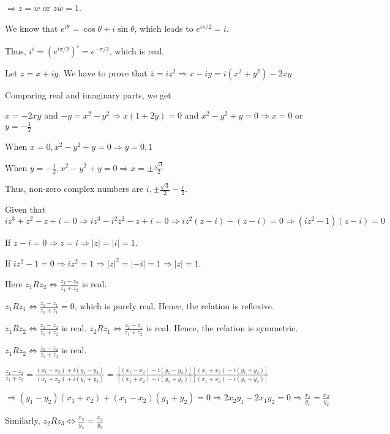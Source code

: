   $\Rightarrow z = w$ or $z\overline{w} = 1$.
\item We know that $e^{i\theta} = \cos\theta + i\sin\theta$, which leads to $e^{i\pi/2} = i$.

  Thus, $i^i = \left(e^{i\pi/2}\right)^i = e^{-\pi/2}$, which is real.
\item Let $z = x + iy$. We have to prove that $\overline{z} = iz^2 \Rightarrow x - iy = i(x^2 + y^2) -2xy$

  Comparing real and imaginary parts, we get

  $x = -2xy$ and $-y = x^2 - y^2\Rightarrow x(1 + 2y) = 0$ and $x^2 - y^2 + y = 0\Rightarrow x = 0$ or $y =
  -\frac{1}{2}$

  When $x = 0, x^2 - y^2 + y = 0 \Rightarrow y = 0, 1$

  When $y = -\frac{1}{2}, x^2 - y^2 + y = 0 \Rightarrow x = \pm\frac{\sqrt{3}}{2}$

  Thus, non-zero complex numbers are $i, \pm\frac{\sqrt{3}}{2} - \frac{i}{2}$.
\item Given that $iz^3 + z^2 - z + i = 0 \Rightarrow iz^3 - i^2z^2 - z + i = 0\Rightarrow iz^2(z - i) - (z -
  i) = 0 \Rightarrow (iz^2 - 1)(z - i) = 0$

  If $z - i = 0 \Rightarrow z = i \Rightarrow |z| = |i| = 1$.

  If $iz^2 - 1 = 0 \Rightarrow iz^2 = 1\Rightarrow |z|^2 = |-i| = 1\Rightarrow |z| = 1$.
\item Here $z_1Rz_2\Leftrightarrow \frac{z_1 - z_2}{z_1 + z_2}$ is real.

  $z_1Rz_1\Leftrightarrow \frac{z_1 - z_1}{z_1 + z_1} = 0$, which is purely real. Hence, the relation is
  reflexive.

  $z_1Rz_2\Leftrightarrow \frac{z_1 - z_2}{z_1 + z_2}$ is real. $z_2Rz_1\Leftrightarrow \frac{z_2 - z_1}{z_1
    + z_2}$ is real. Hence, the relation is symmetric.

  $z_1Rz_2\Leftrightarrow \frac{z_1 - z_2}{z_1 + z_2}$ is real.

  $\frac{z_1 - z_2}{z_1 + z_2} = \frac{(x_1 - x_2) + i(y_1 - y_2)}{(x_1 + x_2) + i(y_1 + y_2)} = \frac{[(x_1
      - x_2) + i(y_1 - y_2)][(x_1 + x_2) - i(y_1 + y_2)]}{[(x_1 + x_2) + i(y_1 + y_2)][(x_1 + x_2) - i(y_1 +
      y_2)]}$

  $\Rightarrow (y_1 - y_2)(x_1 + x_2) + (x_1 - x_2)(y_1 + y_2) = 0 \Rightarrow 2x_2y_1 - 2x_1y_2 = 0
  \Rightarrow \frac{x_1}{y_1} = \frac{x_2}{y_2}$

  Similarly, $z_2Rz_3 \Leftrightarrow \frac{x_2}{y_2} = \frac{x_3}{y_3}$

